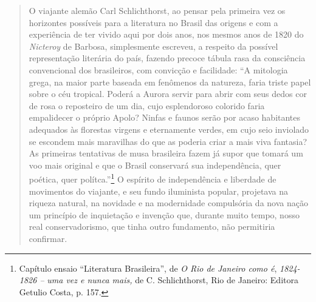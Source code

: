 \begin{quote}
O viajante alemão Carl Schlichthorst, ao pensar pela primeira vez os
horizontes possíveis para a literatura no Brasil das origens e com a
experiência de ter vivido aqui por dois anos, nos mesmos anos de 1820 do
\emph{Nicteroy} de Barbosa, simplesmente escreveu, a respeito da
possível representação literária do país, fazendo precoce tábula rasa da
consciência convencional dos brasileiros, com convicção e facilidade:
``A mitologia grega, na maior parte baseada em fenômenos da natureza,
faria triste papel sobre o céu tropical. Poderá a Aurora servir para
abrir com seus dedos cor de rosa o reposteiro de um dia, cujo
esplendoroso colorido faria empalidecer o próprio Apolo? Ninfas e faunos
serão por acaso habitantes adequados às florestas virgens e eternamente
verdes, em cujo seio inviolado se escondem mais maravilhas do que as
poderia criar a mais viva fantasia? As primeiras tentativas de musa
brasileira fazem já supor que tomará um voo mais original e que o Brasil
conservará sua independência, quer poética, quer polítca.''\footnote{Capítulo
  ensaio ``Literatura Brasileira'', de \emph{O Rio de Janeiro como é},
  \emph{1824-1826 --} \emph{uma vez e nunca mais,} de C. Schlichthorst,
  Rio de Janeiro: Editora Getulio Costa, p. 157.} O espírito de
independência e liberdade de movimentos do viajante, e seu fundo
iluminista popular, projetava na riqueza natural, na novidade e na
modernidade compulsória da nova nação um princípio de inquietação e
invenção que, durante muito tempo, nosso real conservadorismo, que tinha
outro fundamento, não permitiria confirmar.


\end{quote}
